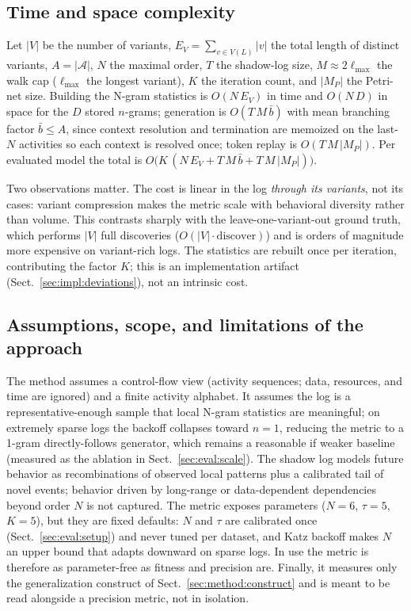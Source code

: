 \documentclass[runningheads]{llncs}
\newcommand{\chg}[1]{\textcolor{chgblue}{#1}}
\begin{document}
\subsection{Time and space complexity}
\label{sec:method:complexity}
Let $|V|$ be the number of variants, $E_V=\sum_{v\in V(L)}|v|$ the total length of distinct variants, $A=|\mathcal{A}|$, $N$ the maximal order, $T$ the shadow-log size, $M\!\approx\!2\ell_{\max}$ the walk cap ($\ell_{\max}$ the longest variant), $K$ the iteration count, and $|M_P|$ the Petri-net size. Building the N-gram statistics is $O(N\,E_V)$ in time and $O(N\,D)$ in space for the $D$ stored $n$-grams; generation is $O(T\,M\,\bar b)$ with mean branching factor $\bar b\le A$, since context resolution and termination are memoized on the last-$N$ activities so each context is resolved once; token replay is $O(T\,M\,|M_P|)$. Per evaluated model the total is $O\!\big(K\,(N\,E_V + T\,M\,\bar b + T\,M\,|M_P|)\big)$.

Two observations matter. The cost is linear in the log \emph{through its variants}, not its cases: variant compression makes the metric scale with behavioral diversity rather than volume. This contrasts sharply with the leave-one-variant-out ground truth, which performs $|V|$ full discoveries ($O(|V|\cdot\mathrm{discover})$) and is orders of magnitude more expensive on variant-rich logs. The statistics are rebuilt once per iteration, contributing the factor $K$; this is an implementation artifact (Sect.~\ref{sec:impl:deviations}), not an intrinsic cost.

\subsection{Assumptions, scope, and limitations of the approach}
\label{sec:method:scope}
The method assumes a control-flow view (activity sequences; data, resources, and time are ignored) and a finite activity alphabet. It assumes the log is a representative-enough sample that local N-gram statistics are meaningful; on extremely sparse logs the backoff collapses toward $n{=}1$, reducing the metric to a 1-gram directly-follows generator, which remains a reasonable if weaker baseline \chg{(measured as the ablation in Sect.~\ref{sec:eval:scale})}. The shadow log models future behavior as recombinations of observed local patterns plus a calibrated tail of novel events; behavior driven by long-range or data-dependent dependencies beyond order $N$ is not captured. The metric exposes parameters ($N{=}6$, $\tau{=}5$, $K{=}5$), but they are fixed defaults: $N$ and $\tau$ are calibrated once (Sect.~\ref{sec:eval:setup}) and never tuned per dataset, and Katz backoff makes $N$ an upper bound that adapts downward on sparse logs. In use the metric is therefore as parameter-free as fitness and precision are. Finally, it measures only the generalization construct of Sect.~\ref{sec:method:construct} and is meant to be read alongside a precision metric, not in isolation.
\end{document}
